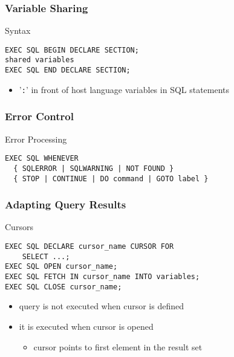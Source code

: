 \documentclass[dvipsnames]{beamer}
\theoremstyle{plain}
\begin{document}
\begin{frame}[fragile]
  \frametitle{Variable Sharing}

  \begin{block}{Syntax}
    \begin{lstlisting}[language=EmbeddedSQL]
EXEC SQL BEGIN DECLARE SECTION;
shared variables
EXEC SQL END DECLARE SECTION;
    \end{lstlisting}
  \end{block}

  \begin{itemize}
    \item '\lstinline!:!' in front of host language variables in SQL statements
  \end{itemize}
\end{frame}

\begin{frame}[fragile]
  \frametitle{Error Control}

  \begin{block}{Error Processing}
    \begin{lstlisting}[language=EmbeddedSQL]
EXEC SQL WHENEVER
  { SQLERROR | SQLWARNING | NOT FOUND }
  { STOP | CONTINUE | DO command | GOTO label }
    \end{lstlisting}
  \end{block}
\end{frame}

\begin{frame}[fragile]
  \frametitle{Adapting Query Results}

  \begin{block}{Cursors}
    \begin{lstlisting}[language=EmbeddedSQL]
EXEC SQL DECLARE cursor_name CURSOR FOR
    SELECT ...;
EXEC SQL OPEN cursor_name;
EXEC SQL FETCH IN cursor_name INTO variables;
EXEC SQL CLOSE cursor_name;
    \end{lstlisting}
  \end{block}

  \pause
  \begin{itemize}
    \item query is not executed when cursor is defined
    \item it is executed when cursor is opened
    \begin{itemize}
      \item cursor points to first element in the result set
    \end{itemize}
  \end{itemize}
\end{frame}
\end{document}
